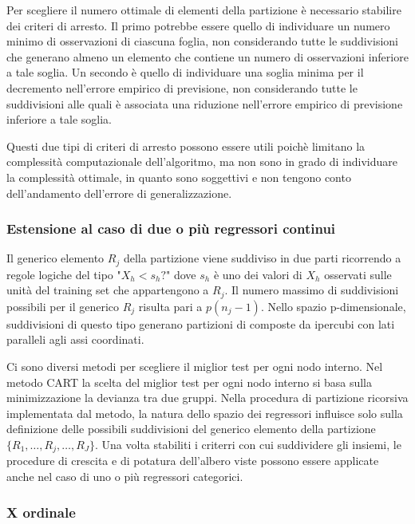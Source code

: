 \documentclass[a4paper]{extarticle}
\begin{document}
Per scegliere il numero ottimale di elementi della partizione è necessario stabilire dei criteri di arresto. Il primo potrebbe essere quello di individuare un numero minimo di osservazioni di ciascuna foglia, non considerando tutte le suddivisioni che generano almeno un elemento che contiene un numero di osservazioni inferiore a tale soglia. Un secondo è quello di individuare una soglia minima per il decremento nell'errore empirico di previsione, non considerando tutte le suddivisioni alle quali è associata una riduzione nell'errore empirico di previsione inferiore a tale soglia.

Questi due tipi di criteri di arresto possono essere utili poichè limitano la complessità computazionale dell'algoritmo, ma non sono in grado di individuare la complessità ottimale, in quanto sono soggettivi e non tengono conto dell'andamento dell'errore di generalizzazione.

\subsubsection{Estensione al caso di due o più regressori continui}

Il generico elemento $R_j$ della partizione viene suddiviso in due parti ricorrendo a regole logiche del tipo "$X_h<s_h?$" dove $s_h$ è uno dei valori di $X_h$ osservati sulle unità del training set che appartengono a $R_j$. Il numero massimo di suddivisioni possibili per il generico $R_j$ risulta pari a $p(n_j-1)$. Nello spazio p-dimensionale, suddivisioni di questo tipo generano partizioni di composte da ipercubi con lati paralleli agli assi coordinati. 

Ci sono diversi metodi per scegliere il miglior test per ogni nodo interno. Nel metodo CART la scelta del miglior test per ogni nodo interno si basa sulla minimizzazione la devianza tra due gruppi. Nella procedura di partizione ricorsiva implementata dal metodo, la natura dello spazio dei regressori influisce solo sulla definizione delle possibili suddivisioni del generico elemento della partizione $\{R_1,\dots,R_j,\dots,R_J\}$. Una volta stabiliti i criterri con cui suddividere gli insiemi, le procedure di crescita e di potatura dell'albero viste possono essere applicate anche nel caso di uno o più regressori categorici.

\subsubsection{X ordinale}
\end{document}
